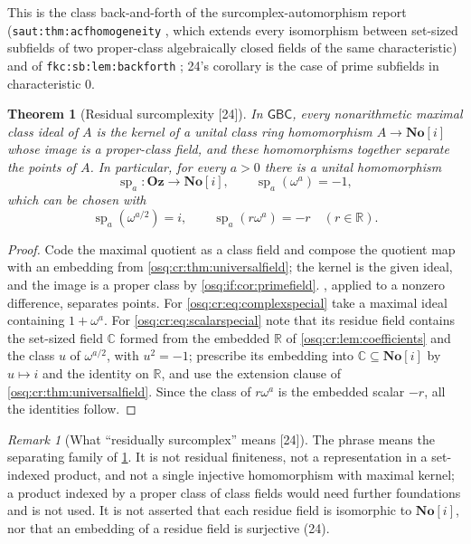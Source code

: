 \documentclass[11pt,letterpaper]{article}
\numberwithin{equation}{section}
\newtheorem{theorem}{Theorem}[section]
\theoremstyle{definition}
\theoremstyle{remark}
\newtheorem{remark}[remark]{Remark}
\theoremstyle{plain}
\newcommand{\No}{\mathbf{No}}
\newcommand{\Oz}{\mathbf{Oz}}
\newcommand{\SC}{\No[i]}
\newcommand{\R}{\mathbb R}
\newcommand{\C}{\mathbb C}
\newcommand{\src}[1]{\textup{\textsf{[#1]}}}
\begin{document}
This is the class back-and-forth of the surcomplex-automorphism report (\nolinkurl{saut:thm:acfhomogeneity} \cite{RepoSaut}, which extends every isomorphism
between set-sized subfields of two proper-class algebraically closed fields of the same characteristic) and of \nolinkurl{fkc:sb:lem:backforth}
\cite{RepoFKC}; 24's corollary is the case of prime subfields in characteristic $0$.

\begin{theorem}[Residual surcomplexity \src{24}]\label{osq:cr:thm:residually}
In $\mathsf{GBC}$, every nonarithmetic maximal class ideal of $A$ is the kernel of a unital class ring homomorphism $A\to\SC$ whose image is a
proper-class field, and these homomorphisms together separate the points of $A$. In particular, for every $a>0$ there is a unital homomorphism
\begin{equation}\label{osq:cr:eq:complexspecial}
 \operatorname{sp}_a:\Oz\longrightarrow\SC,\qquad \operatorname{sp}_a(\omega^a)=-1,
\end{equation}
which can be chosen with
\begin{equation}\label{osq:cr:eq:scalarspecial}
 \operatorname{sp}_a(\omega^{a/2})=i,\qquad \operatorname{sp}_a(r\omega^a)=-r\quad(r\in\R).
\end{equation}
\end{theorem}
\begin{proof}
Code the maximal quotient as a class field and compose the quotient map with an embedding from \cref{osq:cr:thm:universalfield}; the kernel is the given
ideal, and the image is a proper class by \cref{osq:if:cor:primefield}. , applied to a nonzero difference, separates points.
For \eqref{osq:cr:eq:complexspecial} take a maximal ideal containing $1+\omega^a$. For \eqref{osq:cr:eq:scalarspecial} note that its residue field
contains the set-sized field $\C$ formed from the embedded $\R$ of \cref{osq:cr:lem:coefficients} and the class $u$ of $\omega^{a/2}$, with
$u^2=-1$; prescribe its embedding into $\C\subseteq\SC$ by $u\mapsto i$ and the identity on $\R$, and use the extension clause of
\cref{osq:cr:thm:universalfield}. Since the class of $r\omega^a$ is the embedded scalar $-r$, all the identities follow.
\end{proof}

\begin{remark}[What ``residually surcomplex'' means \src{24}]\label{osq:cr:rem:residually}
The phrase means the separating family of \cref{osq:cr:thm:residually}. It is not residual finiteness, not a representation in a set-indexed product,
and not a single injective homomorphism with maximal kernel; a product indexed by a proper class of class fields would need further foundations and is
not used. It is not asserted that each residue field is isomorphic to $\SC$, nor that an embedding of a residue field is surjective (24).
\end{remark}
\end{document}
